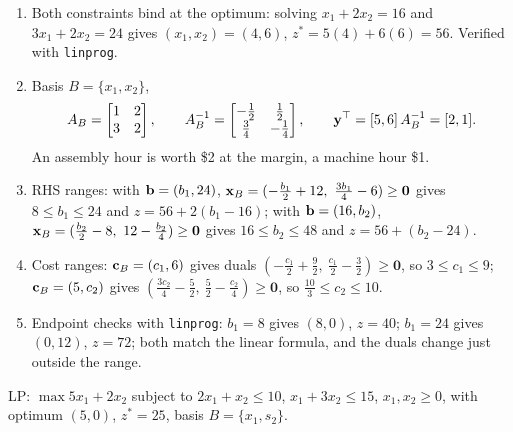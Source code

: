 \begin{enumerate}
\item Both constraints bind at the optimum: solving $x_1 + 2x_2 = 16$ and $3x_1 + 2x_2 = 24$ gives $(x_1, x_2) = (4, 6)$, $z^* = 5(4) + 6(6) = 56$. Verified with \texttt{linprog}.
\item Basis $B = \{x_1, x_2\}$,
\[
A_B = \begin{bmatrix} 1 & 2 \\ 3 & 2 \end{bmatrix}, \qquad
A_B^{-1} = \begin{bmatrix} -\tfrac12 & \tfrac12 \\ \tfrac34 & -\tfrac14 \end{bmatrix},
\qquad
\mathbf{y}^\top = [5,6]\,A_B^{-1} = [2, 1].
\]
An assembly hour is worth \$2 at the margin, a machine hour \$1.
\item RHS ranges: with $\mathbf{b} = (b_1, 24)$, $\x_B = (-\tfrac{b_1}{2} + 12,\ \tfrac{3b_1}{4} - 6) \ge \mathbf{0}$ gives $8 \le b_1 \le 24$ and $z = 56 + 2(b_1 - 16)$; with $\mathbf{b} = (16, b_2)$, $\mathbf{x}_B = (\tfrac{b_2}{2} - 8,\ 12 - \tfrac{b_2}{4}) \ge \mathbf{0}$ gives $16 \le b_2 \le 48$ and $z = 56 + (b_2 - 24)$.
\item Cost ranges: $\mathbf{c}_B = (c_1, 6)$ gives duals $(-\tfrac{c_1}{2} + \tfrac92,\ \tfrac{c_1}{2} - \tfrac32) \ge \mathbf{0}$, so $3 \le c_1 \le 9$; $\mathbf{c}_B = (5, c_2)$ gives $(\tfrac{3c_2}{4} - \tfrac52,\ \tfrac52 - \tfrac{c_2}{4}) \ge \mathbf{0}$, so $\tfrac{10}{3} \le c_2 \le 10$.
\item Endpoint checks with \texttt{linprog}: $b_1 = 8$ gives $(8,0)$, $z = 40$; $b_1 = 24$ gives $(0,12)$, $z = 72$; both match the linear formula, and the duals change just outside the range.
\end{enumerate}


LP: $\max 5x_1 + 2x_2$ subject to $2x_1 + x_2 \le 10$, $x_1 + 3x_2 \le 15$, $x_1, x_2 \ge 0$, with optimum $(5, 0)$, $z^* = 25$, basis $B = \{x_1, s_2\}$.

